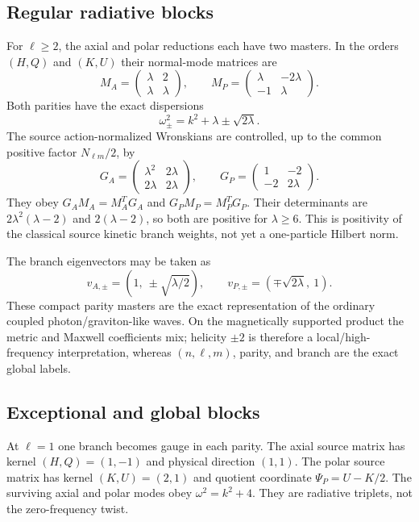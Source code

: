 \documentclass[11pt]{article}
\theoremstyle{remark}
\begin{document}
\subsection{Regular radiative blocks}
For $\ell\geq2$, the axial and polar reductions each have two masters. In the
orders $(H,Q)$ and $(K,U)$ their normal-mode matrices are
\begin{equation}\label{eq:master-matrices}
 M_A=\begin{pmatrix}\lambda&2\\ \lambda&\lambda\end{pmatrix},
 \qquad
 M_P=\begin{pmatrix}\lambda&-2\lambda\\ -1&\lambda\end{pmatrix}.
\end{equation}
Both parities have the exact dispersions
\begin{equation}\label{eq:dispersion}
 \omega_\pm^2=k^2+\lambda\pm\sqrt{2\lambda}.
\end{equation}
The source action-normalized Wronskians are controlled, up to the common
positive factor $N_{\ell m}/2$, by
\begin{equation}\label{eq:source-forms}
 G_A=\begin{pmatrix}\lambda^2&2\lambda\\2\lambda&2\lambda\end{pmatrix},
 \qquad
 G_P=\begin{pmatrix}1&-2\\-2&2\lambda\end{pmatrix}.
\end{equation}
They obey $G_AM_A=M_A^TG_A$ and $G_PM_P=M_P^TG_P$. Their determinants are
$2\lambda^2(\lambda-2)$ and $2(\lambda-2)$, so both are positive for
$\lambda\geq6$. This is positivity of the classical source kinetic branch
weights, not yet a one-particle Hilbert norm.

The branch eigenvectors may be taken as
\begin{equation}
 v_{A,\pm}=(1,\ \pm\sqrt{\lambda/2}),\qquad
 v_{P,\pm}=(\mp\sqrt{2\lambda},\ 1).
\end{equation}
These compact parity masters are the exact representation of the ordinary
coupled photon/graviton-like waves. On the magnetically supported product
the metric and Maxwell coefficients mix; helicity $\pm2$ is therefore a
local/high-frequency interpretation, whereas $(n,\ell,m)$, parity, and
branch are the exact global labels.

\subsection{Exceptional and global blocks}
At $\ell=1$ one branch becomes gauge in each parity. The axial source matrix
has kernel $(H,Q)=(1,-1)$ and physical direction $(1,1)$. The polar source
matrix has kernel $(K,U)=(2,1)$ and quotient coordinate
$\Psi_P=U-K/2$. The surviving axial and polar modes obey
$\omega^2=k^2+4$. They are radiative triplets, not the zero-frequency twist.
\end{document}

